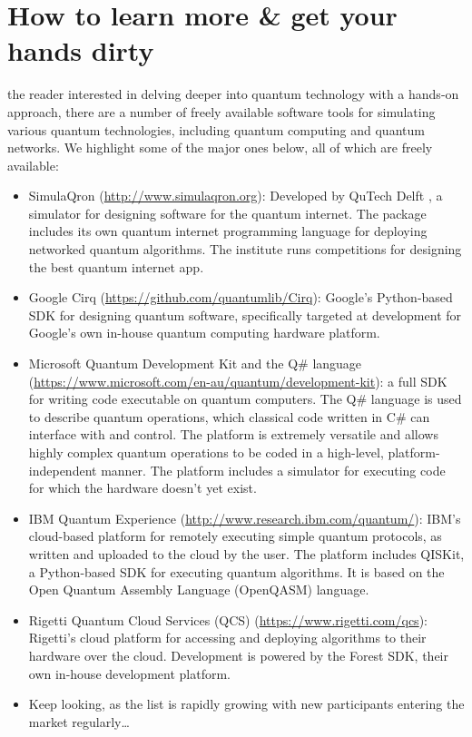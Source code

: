 %
%

\section{How to learn more \& get your hands dirty}

 the reader interested in delving deeper into quantum technology with a hands-on approach, there are a number of freely available software tools for simulating various quantum technologies, including quantum computing and quantum networks. We highlight some of the major ones below, all of which are freely available:

\begin{itemize}
	\item SimulaQron (\href{http://www.simulaqron.org}{http://www.simulaqron.org}): Developed by QuTech Delft \cite{bib:AxelDahlbergQron}, a simulator for designing software for the quantum internet. The package includes its own quantum internet programming language for deploying networked quantum algorithms. The institute runs competitions for designing the best quantum internet app.
	\item Google Cirq (\href{https://github.com/quantumlib/Cirq}{https://github.com/quantumlib/Cirq}): Google's Python-based SDK for designing quantum software, specifically targeted at development for Google's own in-house quantum computing hardware platform.
	\item Microsoft Quantum Development Kit and the Q\# language (\href{https://www.microsoft.com/en-au/quantum/development-kit}{https://www.microsoft.com/en-au/quantum/development-kit}): a full SDK for writing code executable on quantum computers. The Q\# language is used to describe quantum operations, which classical code written in C\# can interface with and control. The platform is extremely versatile and allows highly complex quantum operations to be coded in a high-level, platform-independent manner. The platform includes a simulator for executing code for which the hardware doesn't yet exist.
	\item IBM Quantum Experience (\href{http://www.research.ibm.com/quantum/}{http://www.research.ibm.com/quantum/}): IBM's cloud-based platform for remotely executing simple quantum protocols, as written and uploaded to the cloud by the user. The platform includes QISKit, a Python-based SDK for executing quantum algorithms. It is based on the Open Quantum Assembly Language (OpenQASM) language.
	\item Rigetti Quantum Cloud Services (QCS) (\href{https://www.rigetti.com/qcs}{https://www.rigetti.com/qcs}): Rigetti's cloud platform for accessing and deploying algorithms to their hardware over the cloud. Development is powered by the Forest SDK, their own in-house development platform.
	\item Keep looking, as the list is rapidly growing with new participants entering the market regularly\ldots
\end{itemize}
